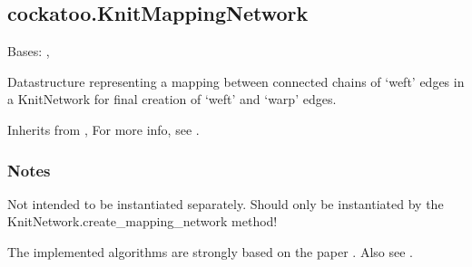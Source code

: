 \documentclass[letterpaper,10pt,english]{sphinxmanual}
\begin{document}
\begin{fulllineitems}
\begin{fulllineitems}
\begin{quote}
\begin{description}
\end{description}\end{quote}

\end{fulllineitems}


\end{fulllineitems}



\subsection{cockatoo.KnitMappingNetwork}
\label{\detokenize{cockatoo:cockatoo-knitmappingnetwork}}

\begin{fulllineitems}
\label{\detokenize{cockatoo:cockatoo.KnitMappingNetwork}}
Bases: , 

Datastructure representing a mapping between connected chains of ‘weft’
edges in a KnitNetwork for final creation of ‘weft’ and ‘warp’ edges.

Inherits from , {\hyperref[\detokenize{cockatoo:cockatoo.KnitNetworkBase}]{}}
For more info, see  \sphinxfootnotemark[13].
\subsubsection*{Notes}

Not intended to be instantiated separately. Should only be instantiated
by the KnitNetwork.create\_mapping\_network method!

The implemented algorithms are strongly based on the paper
 \sphinxfootnotemark[1].
Also see  \sphinxfootnotemark[2].


\end{fulllineitems}
\end{document}
